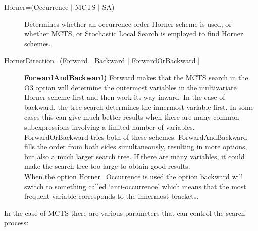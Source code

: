 \begin{description}
\item[Horner=(Occurrence $|$ MCTS $|$ SA)] Determines whether an 
  occurrence order Horner scheme is used, or
  whether MCTS, or Stochastic Local Search is employed to
  find Horner schemes.

\item[HornerDirection=(Forward $|$ Backward $|$ ForwardOrBackward $|$] \hfill
  {\bf ForwardAndBackward)}
  Forward makes that the MCTS search in the O3 option will 
  determine the outermost variables in the multivariate Horner scheme first 
  and then work its way inward.
  In the case of backward, the tree search determines the innermost variable 
  first. In some cases this can give much better results when there are 
  many common subexpressions involving a limited number of variables.
  ForwardOrBackward tries both of these
  schemes. ForwardAndBackward fills the order from both sides
  simultaneously, resulting in more options, but also a much larger
  search tree. If there are many variables, it could make the search tree 
  too large to obtain good results. \hfill \\
  When the option Horner=Occurrence is used the option backward will switch 
  to something called `anti-occurrence' which means that the most frequent 
  variable corresponds to the innermost brackets.
\end{description}

In the case of MCTS there are 
various parameters that can control the search process:

